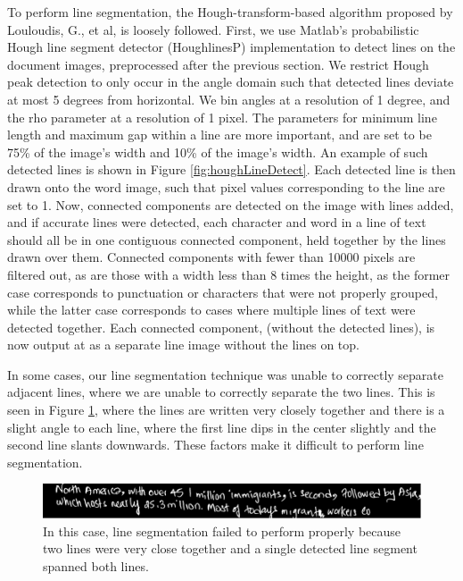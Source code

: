 \documentclass[paper=a4, fontsize=11pt]{scrartcl} %
\numberwithin{equation}{section} %
\numberwithin{figure}{section} %
\numberwithin{table}{section} %
\begin{document}
To perform line segmentation, the Hough-transform-based algorithm
proposed by Louloudis, G., et al, \cite{BlockBased} is loosely
followed. First, we use Matlab's probabilistic Hough line segment
detector (HoughlinesP) implementation to detect lines on the document
images, preprocessed after the previous section. We restrict Hough
peak detection to only occur in the angle domain such that detected
lines deviate at most 5 degrees from horizontal. We bin angles at a
resolution of 1 degree, and the rho parameter at a resolution of 1
pixel. The parameters for minimum line length and maximum gap within a
line are more important, and are set to be 75\% of the image's width
and 10\% of the image's width. An example of such detected lines is
shown in Figure \ref{fig:houghLineDetect}. Each detected line is then
drawn onto the word image, such that pixel values corresponding to the
line are set to 1. Now, connected components are detected on the image
with lines added, and if accurate lines were detected, each character
and word in a line of text should all be in one contiguous connected
component, held together by the lines drawn over them. Connected
components with fewer than 10000 pixels are filtered out, as are those
with a width less than 8 times the height, as the former case
corresponds to punctuation or characters that were not properly
grouped, while the latter case corresponds to cases where multiple
lines of text were detected together. Each connected component,
(without the detected lines), is now output at as a separate line
image without the lines on top. 

In some cases, our line segmentation technique was unable to correctly separate adjacent lines, where we are unable to correctly separate the two lines. This is seen in Figure \ref{fig:linefail}, where the lines are written very closely together and there is a slight angle to each line, where the first line dips in the center slightly and the second line slants downwards. These factors make it difficult to perform line segmentation.

\begin{figure}
\centering \includegraphics{linefail.png}
\caption{In this case, line segmentation failed to perform properly because two lines were very close together and a single detected line segment spanned both lines.}
\label{fig:linefail}
\end{figure}
\end{document}
